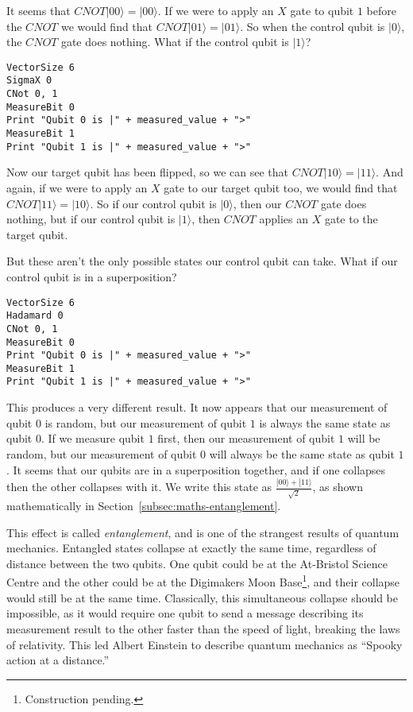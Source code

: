 \documentclass[twocolumn]{article}
\begin{document}
It seems that $CNOT|00\rangle = |00\rangle$. If we were to apply an $X$ gate to qubit $1$ before the $CNOT$ we would find that $CNOT|01\rangle = |01\rangle$. So when the control qubit is $|0\rangle$, the $CNOT$ gate does nothing. What if the control qubit is $|1\rangle$?

\begin{lstlisting}
VectorSize 6
SigmaX 0
CNot 0, 1
MeasureBit 0
Print "Qubit 0 is |" + measured_value + ">"
MeasureBit 1
Print "Qubit 1 is |" + measured_value + ">"
\end{lstlisting}

Now our target qubit has been flipped, so we can see that $CNOT|10\rangle = |11\rangle$. And again, if we were to apply an $X$ gate to our target qubit too, we would find that $CNOT|11\rangle = |10\rangle$. So if our control qubit is $|0\rangle$, then our $CNOT$ gate does nothing, but if our control qubit is $|1\rangle$, then $CNOT$ applies an $X$ gate to the target qubit.

But these aren't the only possible states our control qubit can take. What if our control qubit is in a superposition?

\begin{lstlisting}
VectorSize 6
Hadamard 0
CNot 0, 1
MeasureBit 0
Print "Qubit 0 is |" + measured_value + ">"
MeasureBit 1
Print "Qubit 1 is |" + measured_value + ">"
\end{lstlisting}

This produces a very different result. It now appears that our measurement of qubit $0$ is random, but our measurement of qubit $1$ is always the same state as qubit $0$. If we measure qubit $1$ first, then our measurement of qubit $1$ will be random, but our measurement of qubit $0$ will always be the same state as qubit $1$. It seems that our qubits are in a superposition together, and if one collapses then the other collapses with it. We write this state as $\frac{|00\rangle + |11\rangle}{\sqrt{2}}$, as shown mathematically in Section~\ref{subsec:maths-entanglement}.

This effect is called {\em entanglement}, and is one of the strangest results of quantum mechanics. Entangled states collapse at exactly the same time, regardless of distance between the two qubits. One qubit could be at the At-Bristol Science Centre and the other could be at the Digimakers Moon Base\footnote{Construction pending.}, and their collapse would still be at the same time. Classically, this simultaneous collapse should be impossible, as it would require one qubit to send a message describing its measurement result to the other faster than the speed of light, breaking the laws of relativity. This led Albert Einstein to describe quantum mechanics as ``Spooky action at a distance.''
\end{document}
